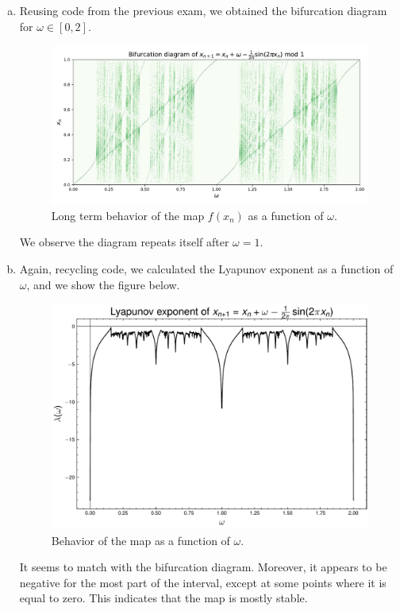 \begin{enumerate}[(a)]
    \item Reusing code from the previous exam, we obtained the bifurcation diagram for $\omega \in [0, 2]$.
    \begin{figure}[!ht]
        \centering
        \includegraphics[scale=0.60]{images/CIRCLE-GREENS.pdf}
        \caption{Long term behavior of the map $f(x_n)$ as a function of $\omega$.}
        \label{fig:1a}
    \end{figure}

    We observe the diagram repeats itself after $\omega = 1$.

    \item Again, recycling code, we calculated the Lyapunov exponent as a function of $\omega$, and 
    we show the figure below.
    \begin{figure}[!ht]
        \centering
        \includegraphics[scale=0.65]{images/cir_lya.pdf}
        \caption{Behavior of the map as a function of $\omega$.}
        \label{fig:1b}
    \end{figure}

    \newpage
    It seems to match with the bifurcation diagram. Moreover, it appears to be 
    negative for the most part of the interval, except at some points where it is equal to zero.
    This indicates that the map is mostly stable.
\end{enumerate}

